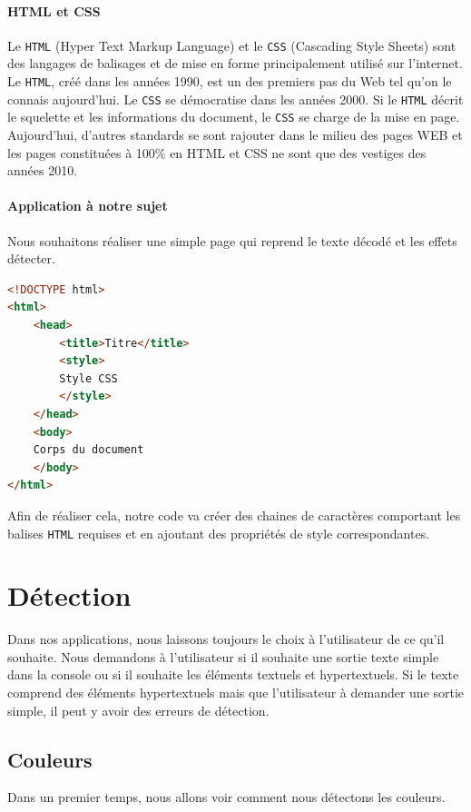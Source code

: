 \documentclass[a4paper,12pt,titlepage]{report}
\begin{document}
	\paragraph{HTML et CSS} Le \texttt{HTML} (Hyper Text Markup Language) et le \texttt{CSS} (Cascading Style Sheets) sont des langages de balisages et de mise en forme principalement utilisé sur l'internet. Le \texttt{HTML}, créé dans les années 1990, est un des premiers pas du Web tel qu'on le connais aujourd'hui. Le \texttt{CSS} se démocratise dans les années 2000. Si le \texttt{HTML} décrit le squelette et les informations du document, le \texttt{CSS} se charge de la mise en page. Aujourd'hui, d'autres standards se sont rajouter dans le milieu des pages WEB et les pages constituées à 100\% en HTML et CSS ne sont que des vestiges des années 2010.
	\paragraph{Application à notre sujet} Nous souhaitons réaliser une simple page qui reprend le texte décodé et les effets détecter.
\begin{lstlisting}[caption={Structure de base du HTML},language=HTML]
<!DOCTYPE html>
<html>
	<head>
		<title>Titre</title>
		<style>
		Style CSS
		</style>
	</head>
	<body>
	Corps du document
	</body>
</html>
\end{lstlisting}
	Afin de réaliser cela, notre code va créer des chaines de caractères comportant les balises \texttt{HTML} requises et en ajoutant des propriétés de style correspondantes.
	\section{Détection}
	Dans nos applications, nous laissons toujours le choix à l'utilisateur de ce qu'il souhaite. Nous demandons à l'utilisateur si il souhaite une sortie texte simple dans la console ou si il souhaite les éléments textuels et hypertextuels. Si le texte comprend des éléments hypertextuels mais que l'utilisateur à demander une sortie simple, il peut y avoir des erreurs de détection.
	\subsection{Couleurs}
	Dans un premier temps, nous allons voir comment nous détectons les couleurs. 
\end{document}
